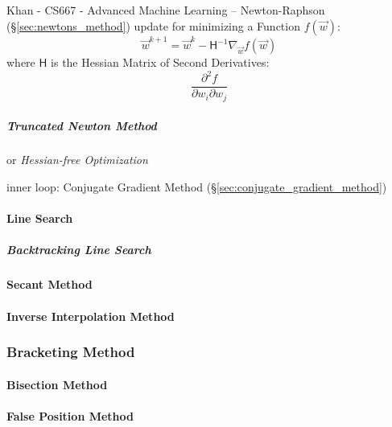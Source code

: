 {Khan - CS667 - Advanced Machine Learning --
Newton-Raphson (\S\ref{sec:newtons_method}) update for minimizing a Function
$f(\vec{w})$:
\[
  \vec{w}^{k+1} = \vec{w}^k - \mathsf{H}^{-1}\nabla_{\vec{w}} f(\vec{w})
\]
where $\mathsf{H}$ is the Hessian Matrix of Second Derivatives:
\[
  \frac{\partial^2 f}{\partial{w_i} \partial{w_j}}
\]



\subparagraph{Truncated Newton Method}\label{sec:truncated_newton}\hfill

or \emph{Hessian-free Optimization}

inner loop: Conjugate Gradient Method (\S\ref{sec:conjugate_gradient_method})



\paragraph{Line Search}\label{sec:line_search}\hfill

\subparagraph{Backtracking Line Search}\label{sec:backtracking_line_search}
\hfill



\paragraph{Secant Method}\label{sec:secant_method}\hfill

\paragraph{Inverse Interpolation Method}\label{sec:inverse_interpolation}\hfill



\subsubsection{Bracketing Method}\label{sec:bracketing_method}

\paragraph{Bisection Method}\label{sec:bisection_method}\hfill

\paragraph{False Position Method}\label{sec:false_position}\hfill



}
